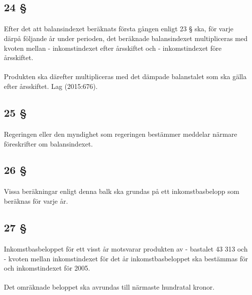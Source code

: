 \documentclass[a4paper,notitlepage,openany,10pt]{book}
\begin{document}
\subsection*{24 §}
\paragraph*{}
Efter det att balansindexet beräknats första gången enligt 23 § ska, för varje därpå följande år under perioden, det beräknade balansindexet multipliceras med kvoten mellan
\newline - inkomstindexet efter årsskiftet och
\newline - inkomstindexet före årsskiftet.
\paragraph*{}
Produkten ska därefter multipliceras med det dämpade balanstalet som ska gälla efter årsskiftet.
Lag (2015:676).
\subsection*{25 §}
\paragraph*{}
Regeringen eller den myndighet som regeringen bestämmer meddelar närmare föreskrifter om balansindexet.
\subsection*{26 §}
\paragraph*{}
Vissa beräkningar enligt denna balk ska grundas på ett inkomstbasbelopp som beräknas för varje år.
\subsection*{27 §}
\paragraph*{}
Inkomstbasbeloppet för ett visst år motsvarar produkten av
\newline - bastalet 43 313 och
\newline - kvoten mellan inkomstindexet för det år inkomstbasbeloppet ska bestämmas för och inkomstindexet för 2005.
\paragraph*{}
Det omräknade beloppet ska avrundas till närmaste hundratal kronor.
\end{document}
